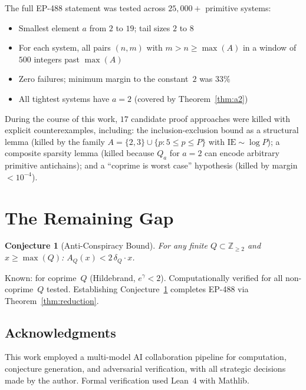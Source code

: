 \documentclass[11pt,a4paper]{amsart}
\theoremstyle{plain}
\newtheorem{conjecture}[theorem]{Conjecture}
\theoremstyle{definition}
\newcommand{\Z}{\mathbb{Z}}
\begin{document}
The full EP-488 statement was tested across $25{,}000+$ primitive systems:

\begin{itemize}[nosep]
\item Smallest element $a$ from $2$ to $19$; tail sizes $2$ to $8$
\item For each system, all pairs $(n,m)$ with $m > n \geq \max(A)$ 
  in a window of $500$ integers past $\max(A)$
\item Zero failures; minimum margin to the constant~$2$ was $33\%$
\item All tightest systems have $a = 2$ (covered by Theorem~\ref{thm:a2})
\end{itemize}

During the course of this work, $17$ candidate proof approaches were killed 
with explicit counterexamples, including:
the inclusion-exclusion bound as a structural lemma (killed by the family 
$A = \{2,3\} \cup \{p : 5 \leq p \leq P\}$ with $\mathrm{IE} \sim \log P$);
a composite sparsity lemma (killed because $Q_a$ for $a=2$ can encode 
arbitrary primitive antichains); and
a ``coprime is worst case'' hypothesis (killed by margin $< 10^{-4}$).

\section{The Remaining Gap}

\begin{conjecture}[Anti-Conspiracy Bound]\label{conj:acb}
For any finite $Q \subset \Z_{\geq 2}$ and $x \geq \max(Q)$:
$A_Q(x) < 2\,\delta_Q \cdot x$.
\end{conjecture}

Known: for coprime~$Q$ (Hildebrand, $e^\gamma < 2$). 
Computationally verified for all non-coprime~$Q$ tested.
Establishing Conjecture~\ref{conj:acb} completes EP-488 via 
Theorem~\ref{thm:reduction}.

\subsection*{Acknowledgments}

This work employed a multi-model AI collaboration pipeline for computation, 
conjecture generation, and adversarial verification, with all strategic 
decisions made by the author. Formal verification used Lean~4 with Mathlib.
\end{document}
